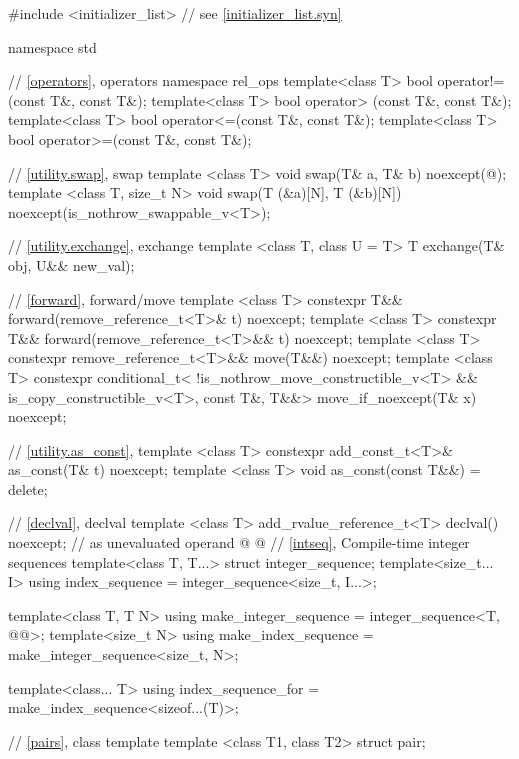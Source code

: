 \begin{codeblock}
#include <initializer_list>     // see \ref{initializer_list.syn}

namespace std {
  // \ref{operators}, operators
  namespace rel_ops {
    template<class T> bool operator!=(const T&, const T&);
    template<class T> bool operator> (const T&, const T&);
    template<class T> bool operator<=(const T&, const T&);
    template<class T> bool operator>=(const T&, const T&);
  }

  // \ref{utility.swap}, swap
  template <class T>
    void swap(T& a, T& b) noexcept(@\seebelow@);
  template <class T, size_t N>
    void swap(T (&a)[N], T (&b)[N]) noexcept(is_nothrow_swappable_v<T>);

  // \ref{utility.exchange}, exchange
  template <class T, class U = T>
    T exchange(T& obj, U&& new_val);

  // \ref{forward}, forward/move
  template <class T>
    constexpr T&& forward(remove_reference_t<T>& t) noexcept;
  template <class T>
    constexpr T&& forward(remove_reference_t<T>&& t) noexcept;
  template <class T>
    constexpr remove_reference_t<T>&& move(T&&) noexcept;
  template <class T>
    constexpr conditional_t<
        !is_nothrow_move_constructible_v<T> && is_copy_constructible_v<T>, const T&, T&&>
      move_if_noexcept(T& x) noexcept;

  // \ref{utility.as_const}, 
  template <class T>
    constexpr add_const_t<T>& as_const(T& t) noexcept;
  template <class T>
    void as_const(const T&&) = delete;

  // \ref{declval}, declval
  template <class T>
    add_rvalue_reference_t<T> declval() noexcept;  // as unevaluated operand
@%
%
%
%
@
  // \ref{intseq}, Compile-time integer sequences
  template<class T, T...>
    struct integer_sequence;
  template<size_t... I>
    using index_sequence = integer_sequence<size_t, I...>;

  template<class T, T N>
    using make_integer_sequence = integer_sequence<T, @\seebelow{}@>;
  template<size_t N>
    using make_index_sequence = make_integer_sequence<size_t, N>;

  template<class... T>
    using index_sequence_for = make_index_sequence<sizeof...(T)>;

  // \ref{pairs}, class template 
  template <class T1, class T2>
    struct pair;

}
\end{codeblock}
